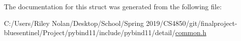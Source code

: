The documentation for this struct was generated from the following file\+:\begin{DoxyCompactItemize}
\item 
C\+:/\+Users/\+Riley Nolan/\+Desktop/\+School/\+Spring 2019/\+C\+S4850/git/finalproject-\/bluesentinel/\+Project/pybind11/include/pybind11/detail/\mbox{\hyperlink{detail_2common_8h}{common.\+h}}\end{DoxyCompactItemize}

